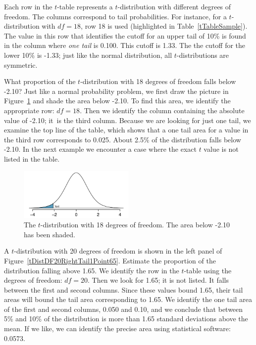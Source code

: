 Each row in the $t$-table represents a $t$-distribution with different degrees of freedom. The columns correspond to tail probabilities. For instance, for a  $t$-distribution with $df=18$, row 18 is used (highlighted in Table~\ref{tTableSample}). The value in this row that identifies the cutoff for an upper tail of 10\% is found in the column where \emph{one tail} is 0.100. This cutoff is 1.33. The the cutoff for the lower 10\% is  -1.33; just like the normal distribution, all $t$-distributions are symmetric.

\begin{example}{What proportion of the $t$-distribution with 18 degrees of freedom falls below -2.10?}
Just like a normal probability problem, we first draw the picture in Figure~\ref{tDistDF18LeftTail2Point10} and shade the area below -2.10. To find this area, we identify the appropriate row: \mbox{$df=18$}. Then we identify the column containing the absolute value of -2.10; it~is the third column. Because we are looking for just one tail, we examine the top line of the table, which shows that a one tail area for a value in the third row corresponds to 0.025. About 2.5\% of the distribution falls below -2.10. In the next example we encounter a case where the exact $t$ value is not listed in the table.
\end{example}

\begin{figure}
\centering
\includegraphics[width=0.5\textwidth]{ch_inference_for_means_oi_biostat/figures/tDistDF18LeftTail2Point10/tDistDF18LeftTail2Point10}
\caption{The $t$-distribution with 18 degrees of freedom. The area below -2.10 has been shaded.}
\label{tDistDF18LeftTail2Point10}
\end{figure}

\begin{example}{A $t$-distribution with 20 degrees of freedom is shown in the left panel of Figure~\ref{tDistDF20RightTail1Point65}. Estimate the proportion of the distribution falling above 1.65.}
We identify the row in the $t$-table using the degrees of freedom: $df=20$. Then we look for 1.65; it is not listed. It falls between the first and second columns. Since these values bound 1.65, their tail areas will bound the tail area corresponding to 1.65. We identify the one tail area of the first and second columns, 0.050 and 0.10, and we conclude that between 5\% and 10\% of the distribution is more than 1.65 standard deviations above the mean. If we like, we can identify the precise area using statistical software: 0.0573.
\end{example}

